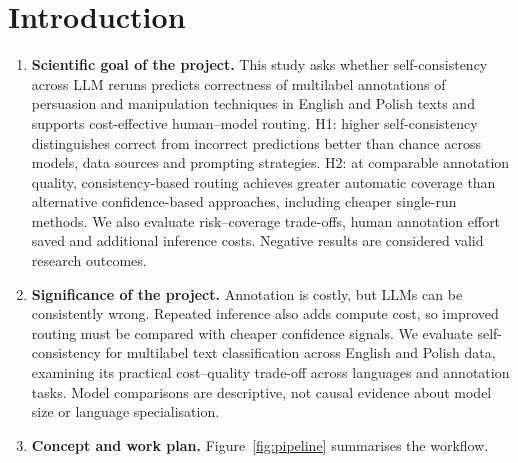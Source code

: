 \documentclass[11pt]{article}
\begin{document}
\section{Introduction}
\begin{enumerate}
\item \textbf{Scientific goal of the project.}
This study asks whether self-consistency across LLM reruns predicts correctness of multilabel annotations of persuasion and manipulation techniques in English and Polish texts and supports cost-effective human--model routing. H1: higher self-consistency distinguishes correct from incorrect predictions better than chance across models, data sources and prompting strategies. H2: at comparable annotation quality, consistency-based routing achieves greater automatic coverage than alternative confidence-based approaches, including cheaper single-run methods. We also evaluate risk--coverage trade-offs, human annotation effort saved and additional inference costs. Negative results are considered valid research outcomes.

\item \textbf{Significance of the project.}
Annotation is costly, but LLMs can be consistently wrong. Repeated inference also adds compute cost, so improved routing must be compared with cheaper confidence signals. We evaluate self-consistency for multilabel text classification across English and Polish data, examining its practical cost--quality trade-off across languages and annotation tasks. Model comparisons are descriptive, not causal evidence about model size or language specialisation.

\newpage
\item \textbf{Concept and work plan.}
Figure~\ref{fig:pipeline} summarises the workflow.


\end{enumerate}
\end{document}
